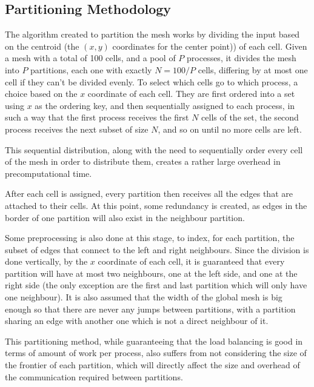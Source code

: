 \subsection{Partitioning Methodology}
\label{subsec:part_method}

The algorithm created to partition the mesh works by dividing the input based on the centroid (the $(x, y)$ coordinates for the center point)) of each cell. Given a mesh with a total of 100 cells, and a pool of $P$ processes, it divides the mesh into $P$ partitions, each one with exactly $N=100/P$ cells, differing by at most one cell if they can't be divided evenly. To select which cells go to which process, a choice based on the $x$ coordinate of each cell. They are first ordered into a set using $x$ as the ordering key, and then sequentially assigned to each process, in such a way that the first process receives the first $N$ cells of the set, the second process receives the next subset of size $N$, and so on until no more cells are left.

This sequential distribution, along with the need to sequentially order every cell of the mesh in order to distribute them, creates a rather large overhead in precomputational time.

After each cell is assigned, every partition then receives all the edges that are attached to their cells. At this point, some redundancy is created, as edges in the border of one partition will also exist in the neighbour partition.

Some preprocessing is also done at this stage, to index, for each partition, the subset of edges that connect to the left and right neighbours. Since the division is done vertically, by the $x$ coordinate of each cell, it is guaranteed that every partition will have at most two neighbours, one at the left side, and one at the right side (the only exception are the first and last partition which will only have one neighbour). It is also assumed that the width of the global mesh is big enough so that there are never any jumps between partitions, with a partition sharing an edge with another one which is not a direct neighbour of it.

This partitioning method, while guaranteeing that the load balancing is good in terms of amount of work per process, also suffers from not considering the size of the frontier of each partition, which will directly affect the size and overhead of the communication required between partitions.